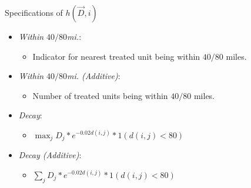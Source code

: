 \documentclass[aspectratio=169]{beamer}
\begin{document}

\begin{frame}{Specifications of $h(\vec{D}, i)$}
    
    \begin{itemize}
        \item \textit{Within $40/80$mi.}:
        \begin{itemize}
            \item Indicator for nearest treated unit being within $40/80$ miles.
        \end{itemize}
        
        \item \textit{Within $40/80$mi. (Additive)}: 
        \begin{itemize}
            \item Number of treated units being within $40/80$ miles.
        \end{itemize}
        

        \item \textit{Decay}: 
        \begin{itemize}
            \item $\max_j D_j * e^{-0.02 d(i,j)} * 1(d(i,j) < 80)$
        \end{itemize}
        
        \item \textit{Decay (Additive)}: 
        \begin{itemize}
            \item $\sum_j D_j * e^{-0.02 d(i,j)} * 1(d(i,j) < 80)$
        \end{itemize}
        
    \end{itemize}

\end{frame}


\end{document}
